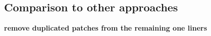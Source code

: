 \documentclass[conference]{IEEEtran}
\newcommand{\todo}[1]
  {{\scriptsize \textbf{\color{red} {#1}}}}
\begin{document}
\subsection{Comparison to other approaches}
\label{sec:comparison}


\todo{remove duplicated patches from the remaining one liners}
\newcommand\mR[2]{\multirow{#1}{*}{#2}}
\newcommand\mCR[2]{\mII{\mR{#1}{#2}}}
\newcommand \mC[1]{\multicolumn{2}{c}{#1}}
\end{document}
